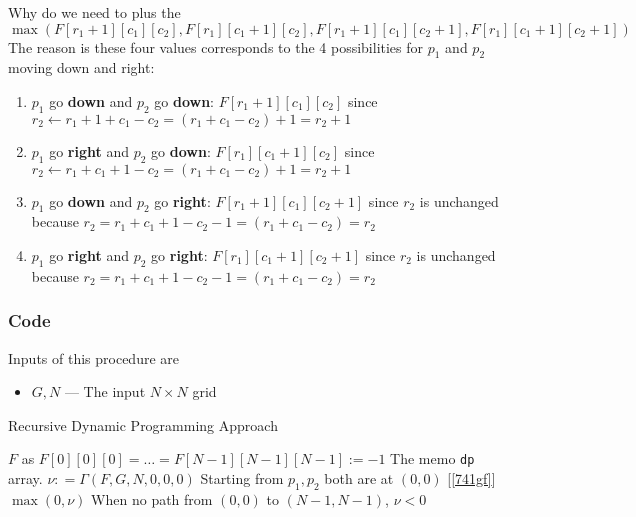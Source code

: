 \par
Why do we need to plus the 
\[
\max(F[r_1+1][c_1][c_2], F[r_1][c_1+1][c_2], F[r_1+1][c_1][c_2+1], F[r_1][c_1+1][c_2+1])
\]
The reason is these four values corresponds to the 4 possibilities for $p_1$ and $p_2$ moving down and right:
\begin{enumerate}
\item $p_1$ go \textbf{down} and $p_2$ go \textbf{down}: $F[r_1+1][c_1][c_2]$ since $r_2 \gets r_1 + 1 +c_1 -c_2 = (r_1+c_1-c_2) + 1 = r_2+1$
\item $p_1$ go \textbf{right} and $p_2$ go \textbf{down}: $F[r_1][c_1+1][c_2]$ since $r_2 \gets r_1 + c_1 + 1 -c_2 = (r_1+c_1-c_2) + 1 = r_2+1$
\item $p_1$ go \textbf{down} and $p_2$ go \textbf{right}: $F[r_1+1][c_1][c_2+1]$ since $r_2$ is unchanged because $r_2= r_1 + c_1 + 1 -c_2 - 1 = (r_1+c_1-c_2) = r_2$
\item $p_1$ go \textbf{right} and $p_2$ go \textbf{right}: $F[r_1][c_1+1][c_2+1]$ since $r_2$ is unchanged because $r_2= r_1 + c_1 + 1 -c_2 - 1 = (r_1+c_1-c_2) = r_2$
\end{enumerate}
\subsubsection{Code}
Inputs of this procedure are
\begin{itemize}
\item $G, N$ --- The input $N\times N $ grid
\end{itemize}
\setcounter{algorithm}{0}
\begin{algorithm}[H]
\caption{Recursive Dynamic Programming Approach}
\begin{algorithmic}[1]
\State $F$ as $F[0][0][0] = \ldots = F[N-1][N-1][N-1]:= -1$ \Comment The memo \texttt{dp} array.
\State $\nu: = \Gamma(F, G, N, 0, 0, 0)$ \Comment Starting from $p_1, p_2$ both are at $(0,0)$ [\ref{741gf}]
\State \Return $\max(0, \nu)$ \Comment When no path from $(0,0)$ to $(N-1, N-1)$, $\nu < 0$
\EndProcedure
\end{algorithmic}
\end{algorithm}

